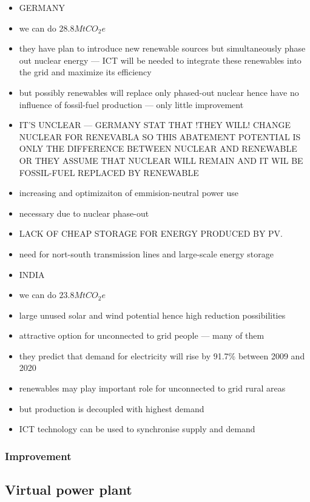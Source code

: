 \documentclass[11pt, twocolumn]{article}
\begin{document}
\begin{itemize}
\item GERMANY
\item we can do $28.8 Mt CO_2e$
\item they have plan to introduce new renewable sources but simultaneously phase out nuclear energy --- ICT will be needed to integrate these renewables into the grid and maximize its efficiency
\item but possibly renewables will replace only phased-out nuclear hence have no influence of fossil-fuel production --- only little improvement
\item IT'S UNCLEAR --- GERMANY STAT THAT !THEY WILL! CHANGE NUCLEAR FOR RENEVABLA SO THIS ABATEMENT POTENTIAL IS ONLY THE DIFFERENCE BETWEEN NUCLEAR AND RENEWABLE OR THEY ASSUME THAT NUCLEAR WILL REMAIN AND IT WIL BE FOSSIL-FUEL REPLACED BY RENEWABLE

\item increasing and optimizaiton of emmision-neutral power use
\item necessary due to nuclear phase-out

\item LACK OF CHEAP STORAGE FOR ENERGY PRODUCED BY PV.
\item need for nort-south transmission lines and large-scale energy storage


\item INDIA
\item we can do $23.8 Mt CO_2e$
\item large unused solar and wind potential hence high reduction possibilities
\item attractive option for unconnected to grid people --- many of them
\item they predict that demand for electricity will rise by 91.7\% between 2009 and 2020
\item renewables may play important role for unconnected to grid rural areas
\item but production is decoupled with highest demand
\item ICT technology can be used to synchronise supply and demand

\end{itemize}
\subsubsection{Improvement}

\subsection{Virtual power plant}
\end{document}
